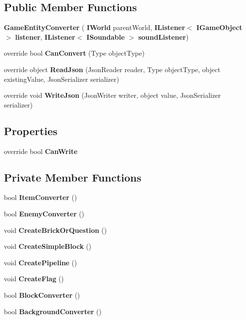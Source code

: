 \subsection*{Public Member Functions}
\begin{DoxyCompactItemize}
\item 
\textbf{ Game\+Entity\+Converter} (\textbf{ I\+World} parent\+World, \textbf{ I\+Listener}$<$ \textbf{ I\+Game\+Object} $>$ \textbf{ listener}, \textbf{ I\+Listener}$<$ \textbf{ I\+Soundable} $>$ \textbf{ sound\+Listener})
\item 
override bool \textbf{ Can\+Convert} (Type object\+Type)
\item 
override object \textbf{ Read\+Json} (Json\+Reader reader, Type object\+Type, object existing\+Value, Json\+Serializer serializer)
\item 
override void \textbf{ Write\+Json} (Json\+Writer writer, object value, Json\+Serializer serializer)
\end{DoxyCompactItemize}
\subsection*{Properties}
\begin{DoxyCompactItemize}
\item 
override bool \textbf{ Can\+Write}\hspace{0.3cm}{\ttfamily  [get]}
\end{DoxyCompactItemize}
\subsection*{Private Member Functions}
\begin{DoxyCompactItemize}
\item 
bool \textbf{ Item\+Converter} ()
\item 
bool \textbf{ Enemy\+Converter} ()
\item 
void \textbf{ Create\+Brick\+Or\+Question} ()
\item 
void \textbf{ Create\+Simple\+Block} ()
\item 
void \textbf{ Create\+Pipeline} ()
\item 
void \textbf{ Create\+Flag} ()
\item 
bool \textbf{ Block\+Converter} ()
\item 
bool \textbf{ Background\+Converter} ()
\end{DoxyCompactItemize}
